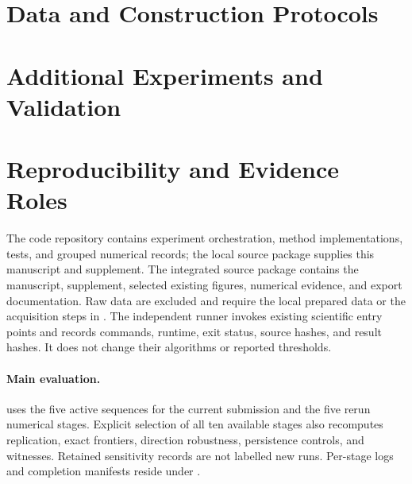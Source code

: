 \documentclass[10pt,letterpaper]{article}
\theoremstyle{remark}\newtheorem{remark}[lemma]{Remark}
\begin{document}
\section{Data and Construction Protocols}






\section{Additional Experiments and Validation}











\clearpage

\clearpage
\section{Reproducibility and Evidence Roles}
The code repository contains experiment orchestration, method implementations, tests, and grouped numerical records; the local source package supplies this manuscript and supplement. The integrated source package contains the manuscript, supplement, selected existing figures, numerical evidence, and export documentation. Raw data are excluded and require the local prepared data or the acquisition steps in . The independent runner invokes existing scientific entry points and records commands, runtime, exit status, source hashes, and result hashes. It does not change their algorithms or reported thresholds.

\paragraph{Main evaluation.}  uses the five active sequences for the current submission and the five rerun numerical stages. Explicit selection of all ten available stages also recomputes replication, exact frontiers, direction robustness, persistence controls, and witnesses. Retained sensitivity records are not labelled new runs. Per-stage logs and completion manifests reside under .
\end{document}
